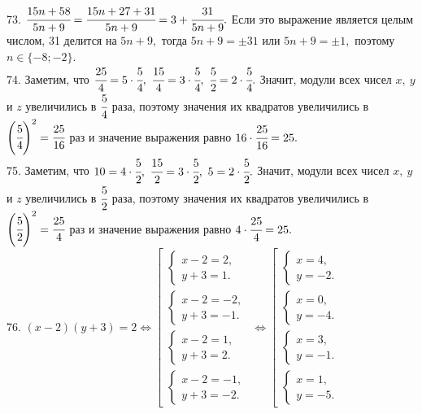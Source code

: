 \documentclass[12pt]{article}
\begin{document}
73. $\cfrac{15n+58}{5n+9}=\cfrac{15n+27+31}{5n+9}=3+\cfrac{31}{5n+9}.$ Если это выражение является целым числом, 31 делится на $5n+9,$ тогда $5n+9=\pm31$ или $5n+9=\pm1,$ поэтому $n\in\{-8;-2\}.$\\
74. Заметим, что $\cfrac{25}{4}=5\cdot\cfrac{5}{4},\ \cfrac{15}{4}=3\cdot\cfrac{5}{4},\ \cfrac{5}{2}=2\cdot\cfrac{5}{4}.$ Значит, модули всех чисел $x,\ y$ и $z$ увеличились в $\cfrac{5}{4}$ раза, поэтому значения их квадратов увеличились в  $\left(\cfrac{5}{4}\right)^2=\cfrac{25}{16}$ раз и значение выражения равно $16\cdot
\cfrac{25}{16}=25.$\\
75. Заметим, что $10=4\cdot\cfrac{5}{2},\ \cfrac{15}{2}=3\cdot\cfrac{5}{2},\ 5=2\cdot\cfrac{5}{2}.$ Значит, модули всех чисел $x,\ y$ и $z$ увеличились в $\cfrac{5}{2}$ раза, поэтому значения их квадратов увеличились в  $\left(\cfrac{5}{2}\right)^2=\cfrac{25}{4}$ раз и значение выражения равно $4\cdot
\cfrac{25}{4}=25.$\\
76. $(x-2)(y+3)=2\Leftrightarrow \left[\begin{array}{l}\begin{cases}x-2=2,\\ y+3=1.\end{cases}\\ \begin{cases}x-2=-2,\\ y+3=-1.\end{cases}\\
\begin{cases}x-2=1,\\ y+3=2.\end{cases}\\ \begin{cases}x-2=-1,\\ y+3=-2.\end{cases}\end{array}\right.\Leftrightarrow
\left[\begin{array}{l}\begin{cases}x=4,\\ y=-2.\end{cases}\\ \begin{cases} x=0,\\ y=-4.\end{cases}\\
\begin{cases}x=3,\\ y=-1.\end{cases}\\ \begin{cases}x=1,\\ y=-5.\end{cases}\end{array}\right.$\\
\end{document}
